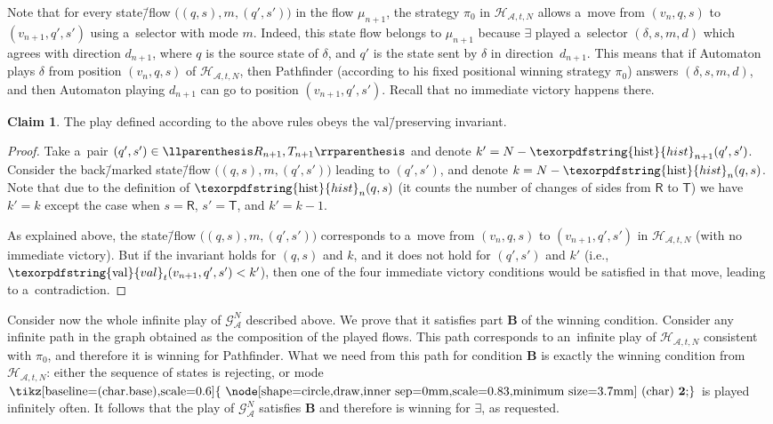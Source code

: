 \documentclass[11pt,a4paper]{amsart}
\theoremstyle{plain}
\theoremstyle{definition}
\newtheorem{clm}[thm]{Claim}
\theoremstyle{defC}
\theoremstyle{thmC}
\theoremstyle{plain}
\numberwithin{equation}{section}
\numberwithin{equation}{section}
\numberwithin{figure}{section}
\newcommand{\ident}[1]{\ensuremath{\texorpdfstring{\mathrm{\mathnm{#1}}}{#1}}\xspace}
\newcommand{\mathcalsym}[1]{\ensuremath{\mathcal{#1}}\xspace}
\newcommand{\CA}{\mathcalsym{A}}
\newcommand{\CG}{\mathcalsym{G}}
\newcommand{\CH}{\mathcalsym{H}}
\newcommand{\mathnm}[1]{#1}
\newcommand{\hist}{\ident{hist}}
\newcommand{\val}{\ident{val}}
\newcommand{\sT}{\mathsf{T}}
\newcommand{\sR}{\mathsf{R}}
\newcommand{\eve}{\ensuremath{\exists}\xspace}
\newcommand*\circled[1]{\tikz[baseline=(char.base),scale=0.6]{
            \node[shape=circle,draw,inner sep=0mm,scale=0.83,minimum size=3.7mm] (char) {\textbf{#1}};}}
\newcommand{\fb}{\mathbf{\text{\circled{2}}}}
\DeclarePairedDelimiter{\pair}{\llparenthesis}{\rrparenthesis}
\newcommand{\itemfont}[1]{\textbf{#1}}
\begin{document}
Note that for every state\=/flow $\big((q,s),m,(q',s')\big)$ in the flow $\mu_{n+1}$, the strategy $\pi_0$ in $\CH_{\CA,t,N}$ allows a~move from $(v_n,q,s)$ to $(v_{n+1},q',s')$ using a~selector with mode $m$.
Indeed, this state flow belongs to $\mu_{n+1}$ because \eve played a~selector $(\delta,s,m,d)$ which agrees with direction $d_{n+1}$,
where $q$ is the source state of $\delta$, and $q'$ is the state sent by $\delta$ in direction~$d_{n+1}$.
This means that if Automaton plays $\delta$ from position $(v_n,q,s)$ of $\CH_{\CA,t,N}$, then Pathfinder (according to his fixed positional winning strategy $\pi_0$) answers $(\delta,s,m,d)$,
and then Automaton playing $d_{n+1}$ can go to position $(v_{n+1},q',s')$.
Recall that no immediate victory happens there.

\begin{clm}\label{claim-invariant}
The play defined according to the above rules obeys the val\=/preserving invariant.
\end{clm}

\begin{proof}
	Take a~pair $(q',s')\in\pair{R_{n+1},T_{n+1}}$ and denote $k'=N-\hist_{n+1}(q',s')$.
	Consider the back\=/marked state\=/flow $\big((q,s),m,(q',s')\big)$ leading to $(q',s')$, and denote $k=N-\hist_{n}(q,s)$.
	Note that due to the definition of $\hist_n(q,s)$ (it counts the number of changes of sides from $\sR$ to $\sT$) we have $k'=k$ except the case when $s=\sR$, $s'=\sT$, and $k'=k{-}1$.
	
	As explained above, the state\=/flow $\big((q,s),m,(q',s')\big)$ corresponds to a~move from $(v_n,q,s)$ to $(v_{n+1},q',s')$ in $\CH_{\CA,t,N}$ (with no immediate victory).
	But if the invariant holds for $(q,s)$ and $k$, and it does not hold for $(q',s')$ and $k'$ (i.e.,~$\val_t(v_{n+1},q',s')< k'$),
	then one of the four immediate victory conditions would be satisfied in that move, leading to a~contradiction.
\end{proof}

Consider now the whole infinite play of $\CG^N_\CA$ described above.
We prove that it satisfies part \itemfont{B} of the winning condition.
Consider any infinite path in the graph obtained as the composition of the played flows.
This path corresponds to an~infinite play of $\CH_{\CA,t,N}$ consistent with $\pi_0$, and therefore it is winning for Pathfinder.
What we need from this path for condition \itemfont{B} is exactly the winning condition from $\CH_{\CA,t,N}$: either the sequence of states is rejecting, or mode $\fb$ is played infinitely often.
It follows that the play of $\CG^N_\CA$ satisfies \itemfont{B} and therefore is winning for $\eve$, as requested.
\end{document}
